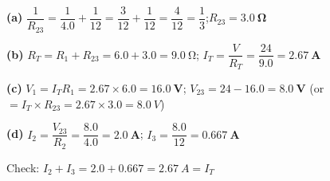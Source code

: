 \documentclass[addpoints]{exam}
\begin{document}
\begin{questions}
\begin{solution}[9cm]
\textbf{(a)} $\dfrac{1}{R_{23}} = \dfrac{1}{4.0} + \dfrac{1}{12} = \dfrac{3}{12} + \dfrac{1}{12}
= \dfrac{4}{12} = \dfrac{1}{3}$;\quad $R_{23} = \mathbf{\SI{3.0}{\ohm}}$

\textbf{(b)} $R_T = R_1 + R_{23} = 6.0 + 3.0 = \SI{9.0}{\ohm}$;\quad
$I_T = \dfrac{V}{R_T} = \dfrac{24}{9.0} = \mathbf{\SI{2.67}{A}}$

\textbf{(c)} $V_1 = I_T R_1 = 2.67 \times 6.0 = \mathbf{\SI{16.0}{V}}$;\quad
$V_{23} = 24 - 16.0 = \mathbf{\SI{8.0}{V}}$ (or $= I_T \times R_{23} = 2.67 \times 3.0 = \SI{8.0}{V}$)

\textbf{(d)} $I_2 = \dfrac{V_{23}}{R_2} = \dfrac{8.0}{4.0} = \mathbf{\SI{2.0}{A}}$;\quad
$I_3 = \dfrac{8.0}{12} = \mathbf{\SI{0.667}{A}}$

Check: $I_2 + I_3 = 2.0 + 0.667 = \SI{2.67}{A} = I_T$ \checkmark
\end{solution}

\end{questions}
\end{document}
